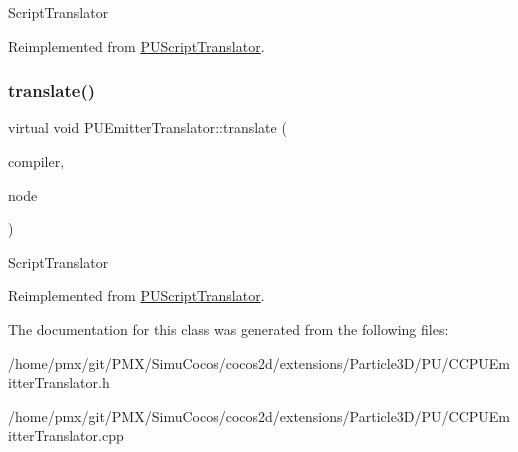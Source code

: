 Script\+Translator 

Reimplemented from \hyperlink{classPUScriptTranslator_a9ff2cdfda9ea8db6fd716e7b69dbe79b}{P\+U\+Script\+Translator}.

\mbox{\label{classPUEmitterTranslator_a18d5543718c2f2161d3924858c9430b9}} 
\subsubsection{\texorpdfstring{translate()}{translate()}\hspace{0.1cm}{\footnotesize\ttfamily [2/2]}}
{\footnotesize\ttfamily virtual void P\+U\+Emitter\+Translator\+::translate (\begin{DoxyParamCaption}\item[{\hyperlink{classPUScriptCompiler}{P\+U\+Script\+Compiler} $\ast$}]{compiler,  }\item[{\hyperlink{classPUAbstractNode}{P\+U\+Abstract\+Node} $\ast$}]{node }\end{DoxyParamCaption})\hspace{0.3cm}{\ttfamily [virtual]}}

Script\+Translator 

Reimplemented from \hyperlink{classPUScriptTranslator_a9ff2cdfda9ea8db6fd716e7b69dbe79b}{P\+U\+Script\+Translator}.



The documentation for this class was generated from the following files\+:\begin{DoxyCompactItemize}
\item 
/home/pmx/git/\+P\+M\+X/\+Simu\+Cocos/cocos2d/extensions/\+Particle3\+D/\+P\+U/C\+C\+P\+U\+Emitter\+Translator.\+h\item 
/home/pmx/git/\+P\+M\+X/\+Simu\+Cocos/cocos2d/extensions/\+Particle3\+D/\+P\+U/C\+C\+P\+U\+Emitter\+Translator.\+cpp\end{DoxyCompactItemize}
